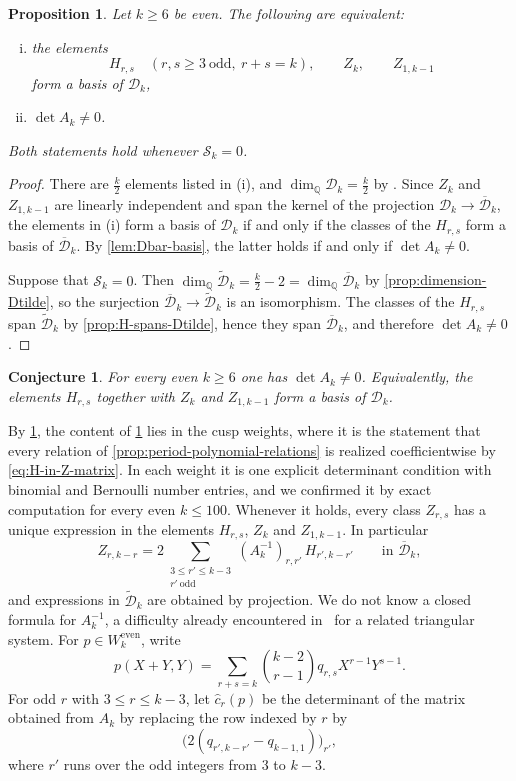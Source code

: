 \documentclass[12pt]{amsart}
\numberwithin{equation}{section}
\theoremstyle{plain}
\newtheorem{prop}[prop]{Proposition}
\newtheorem{conj}[conj]{Conjecture}
\newcommand{\odd}{\mathrm{odd}}
\newcommand{\even}{\mathrm{even}}
\newcommand{\QQ}{\mathbb{Q}}
\newcommand{\Dk}{\mathcal D_k}
\newcommand{\Dtk}{\widetilde{\mathcal D}_k}
\newcommand{\Dbk}{\overline{\mathcal D}_k}
\begin{document}
\begin{prop}\label{prop:Dk-basis}
Let $k\geq6$ be even. The following are equivalent:
\begin{enumerate}[(i)]
\item the elements
\[
 H_{r,s}\quad(r,s\geq3\ \odd,\ r+s=k),
 \qquad Z_k,\qquad Z_{1,k-1}
\]
form a basis of $\Dk$,
\item $\det A_k\neq0$.
\end{enumerate}
Both statements hold whenever $\mathcal S_k=0$.
\end{prop}

\begin{proof}
There are $\frac k2$ elements listed in (i), and
$\dim_{\QQ}\Dk=\frac k2$ by \cite[Theorem~2]{GKZ}. Since $Z_k$ and
$Z_{1,k-1}$ are linearly independent and span the kernel of the
projection $\Dk\to\Dbk$, the elements in (i) form a basis of $\Dk$ if
and only if the classes of the $H_{r,s}$ form a basis of $\Dbk$. By
\cref{lem:Dbar-basis}, the latter holds if and only if
$\det A_k\neq0$.

Suppose that $\mathcal S_k=0$. Then
$\dim_{\QQ}\Dtk=\frac k2-2=\dim_{\QQ}\Dbk$ by
\cref{prop:dimension-Dtilde}, so the surjection $\Dbk\to\Dtk$ is an
isomorphism. The classes of the $H_{r,s}$ span $\Dtk$ by
\cref{prop:H-spans-Dtilde}, hence they span $\Dbk$, and therefore
$\det A_k\neq0$.
\end{proof}

\begin{conj}\label{conj:detA}
For every even $k\geq6$ one has $\det A_k\neq0$. Equivalently, the
elements $H_{r,s}$ together with $Z_k$ and $Z_{1,k-1}$ form a basis
of $\Dk$.
\end{conj}

By \cref{prop:Dk-basis}, the content of \cref{conj:detA} lies in the
cusp weights, where it is the statement that every relation of
\cref{prop:period-polynomial-relations} is realized coefficientwise
by \eqref{eq:H-in-Z-matrix}. In each weight it is one explicit determinant condition with binomial
and Bernoulli number entries, and we confirmed it by exact computation
for every even $k\leq100$. Whenever it holds, every
class $Z_{r,s}$ has a unique expression in the elements $H_{r,s}$,
$Z_k$ and $Z_{1,k-1}$. In particular
\[
 Z_{r,k-r}=2\sum_{\substack{3\leq r'\leq k-3\\r'\ \odd}}
 (A_k^{-1})_{r,r'}\,H_{r',k-r'}
 \qquad\text{in }\Dbk,
\]
and expressions in $\Dtk$ are obtained by projection. We do not know
a closed formula for $A_k^{-1}$, a difficulty already encountered
in~\cite[Section~3]{KZ} for a related triangular system. For $p\in W_k^{\even}$, write
\[
 p(X+Y,Y)=\sum_{r+s=k}\binom{k-2}{r-1}q_{r,s}X^{r-1}Y^{s-1}.
\]
For odd $r$ with $3\leq r\leq k-3$, let $\widehat c_r(p)$ be the determinant
of the matrix obtained from $A_k$ by replacing the row indexed by $r$ by
\[
 \bigl(2(q_{r',k-r'}-q_{k-1,1})\bigr)_{r'} ,
\]
where $r'$ runs over the odd integers from $3$ to $k-3$.
\end{document}
